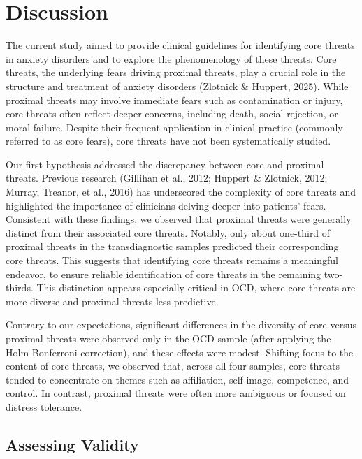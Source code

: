 \documentclass[
  man,floatsintext]{apa7}
\begin{document}
\section{Discussion}\label{discussion}

The current study aimed to provide clinical guidelines for identifying core threats in anxiety disorders and to explore the phenomenology of these threats.
Core threats, the underlying fears driving proximal threats, play a crucial role in the structure and treatment of anxiety disorders (Zlotnick \& Huppert, 2025).
While proximal threats may involve immediate fears such as contamination or injury, core threats often reflect deeper concerns, including death, social rejection, or moral failure.
Despite their frequent application in clinical practice (commonly referred to as core fears), core threats have not been systematically studied.

Our first hypothesis addressed the discrepancy between core and proximal threats.
Previous research (Gillihan et al., 2012; Huppert \& Zlotnick, 2012; Murray, Treanor, et al., 2016) has underscored the complexity of core threats and highlighted the importance of clinicians delving deeper into patients' fears.
Consistent with these findings, we observed that proximal threats were generally distinct from their associated core threats.
Notably, only about one-third of proximal threats in the transdiagnostic samples predicted their corresponding core threats.
This suggests that identifying core threats remains a meaningful endeavor, to ensure reliable identification of core threats in the remaining two-thirds.
This distinction appears especially critical in OCD, where core threats are more diverse and proximal threats less predictive.

Contrary to our expectations, significant differences in the diversity of core versus proximal threats were observed only in the OCD sample (after applying the Holm-Bonferroni correction), and these effects were modest.
Shifting focus to the content of core threats, we observed that, across all four samples, core threats tended to concentrate on themes such as affiliation, self-image, competence, and control.
In contrast, proximal threats were often more ambiguous or focused on distress tolerance.

\subsection{Assessing Validity}\label{assessing-validity}
\end{document}
